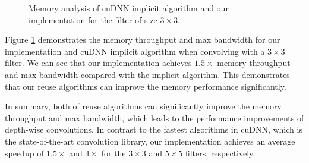 \begin{figure}
\centering

\hspace{0em}
	
\caption{Memory analysis of cuDNN implicit algorithm and our implementation for the filter of size $3 \times 3$.}
\label{fig:depwisememanaly}
\end{figure}

Figure \ref{fig:depwisememanaly} demonstrates the memory throughput and max bandwidth for our implementation and cuDNN implicit algorithm when convolving with a $3 \times 3$ filter. We can see that our implementation achieves $1.5 \times$ memory throughput and max bandwidth compared with the implicit algorithm. This demonstrates that our reuse algorithms can improve the memory performance significantly.

In summary, both of reuse algorithms can significantly improve the memory throughput and max bandwidth, which leads to the performance improvements of depth-wise convolutions.  In contrast to the fastest algorithms in cuDNN, which is the state-of-the-art convolution library, our implementation achieves an average speedup of $1.5\times$ and $4\times$ for the $3 \times 3$ and $5 \times 5$ filters, respectively.

